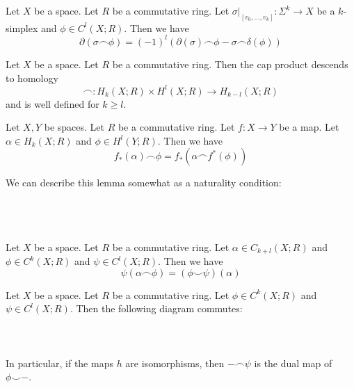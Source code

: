 \documentclass[a4paper]{article}
\begin{document}
\begin{lmm}{}{} Let $X$ be a space. Let $R$ be a commutative ring. Let $\sigma|_[v_0,\dots,v_k]:\Sigma^k\to X$ be a $k$-simplex and $\phi\in C^l(X;R)$. Then we have $$\partial(\sigma\frown\phi)=(-1)^l(\partial(\sigma)\frown\phi-\sigma\frown\delta(\phi))$$
\end{lmm}

\begin{prp}{}{} Let $X$ be a space. Let $R$ be a commutative ring. Then the cap product descends to homology $$\frown:H_k(X;R)\times H^l(X;R)\to H_{k-l}(X;R)$$ and is well defined for $k\geq l$.
\end{prp}

\begin{lmm}{}{} Let $X,Y$ be spaces. Let $R$ be a commutative ring. Let $f:X\to Y$ be a map. Let $\alpha\in H_k(X;R)$ and $\phi\in H^l(Y;R)$. Then we have $$f_\ast(\alpha)\frown\phi=f_\ast(\alpha\frown f^\ast(\phi))$$
\end{lmm}

We can describe this lemma somewhat as a naturality condition: \\~\\
\\~\\

\begin{lmm}{}{} Let $X$ be a space. Let $R$ be a commutative ring. Let $\alpha\in C_{k+l}(X;R)$ and $\phi\in C^k(X;R)$ and $\psi\in C^l(X;R)$. Then we have $$\psi(\alpha\frown\phi)=(\phi\smile\psi)(\alpha)$$
\end{lmm}

\begin{prp}{}{} Let $X$ be a space. Let $R$ be a commutative ring. Let $\phi\in C^k(X;R)$ and $\psi\in C^l(X;R)$. Then the following diagram commutes: \\~\\
\\~\\
In particular, if the maps $h$ are isomorphisms, then $-\frown\psi$ is the dual map of $\phi\smile-$. 
\end{prp}
\end{document}
